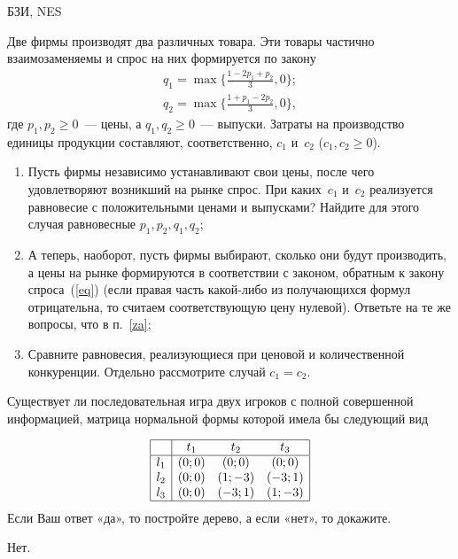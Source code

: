 \begin{problem}
\begin{source}
БЗИ, NES
\end{source} Две
фирмы производят два различных товара. Эти товары частично
взаимозаменяемы и спрос на них формируется по закону
\begin{equation}\label{eq}
\begin{array}{l}
  q_1=\max\biggl\{\frac{1-2p_1+p_2}{3},0\biggr\};\\
  q_2=\max\biggl\{\frac{1+p_1-2p_2}{3},0\biggr\},
\end{array}\end{equation}
где $p_1,p_2\ge 0$~— цены, а $q_1,q_2\ge 0$~— выпуски.
Затраты на производство единицы продукции составляют,
соответственно, $c_1$ и~$c_2$ ($c_1,c_2\ge 0$).
\begin{enumerate}
  \item\label{za} Пусть фирмы независимо устанавливают свои цены,
  после чего удовлетворяют возникший на рынке спрос. При каких~$c_1$
  и~$c_2$ реализуется равновесие с положительными ценами и
  выпусками? Найдите для этого случая равновесные $p_1,p_2,q_1,q_2$;
  \item А теперь, наоборот, пусть фирмы выбирают, сколько они
  будут производить, а цены на рынке формируются в соответствии с
  законом, обратным к закону спроса~(\ref{eq}) (если правая часть какой-либо из получающихся
  формул отрицательна, то считаем соответствующую цену нулевой).
  Ответьте на те же вопросы, что в п.~\ref{za};
  \item Сравните равновесия, реализующиеся при ценовой и количественной
  конкуренции. Отдельно рассмотрите случай $c_1=c_2$.
\end{enumerate}

\begin{sol}

\end{sol}
\end{problem}

\begin{problem}

Существует ли последовательная игра двух игроков с полной совершенной информацией,
матрица нормальной формы которой имела бы следующий  вид\par
\[\begin{array}{|c|ccc|}  \hline {} & {t_{1} } & {t_{2} } & {t_{3} } \\  \hline {l_{1} } & {\left(0;0\right)} & {\left(0;0\right)} & {\left(0;0\right)} \\ {l_{2} } & {\left(0;0\right)} & {\left(1;-3\right)} & {\left(-3;1\right)} \\ {l_{3} } & {\left(0;0\right)} & {\left(-3;1\right)} & {\left(1;-3\right)} \\  \hline  \end{array}\]
Если Ваш ответ «да», то постройте дерево, а если «нет», то докажите.



\begin{sol}
Нет.
\end{sol}
\end{problem}






